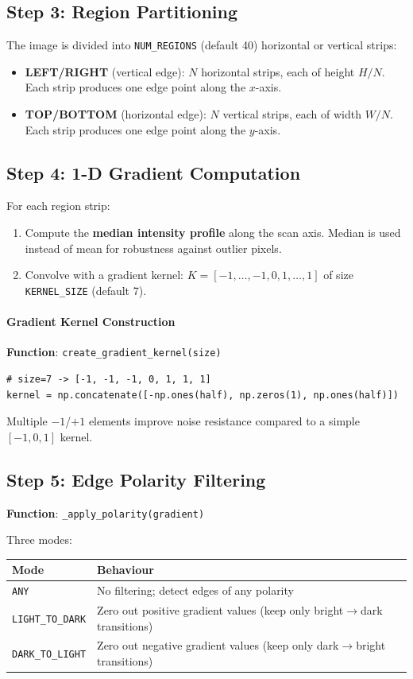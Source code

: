\documentclass[11pt,a4paper]{article}
\begin{document}
\subsection{Step 3: Region Partitioning}
The image is divided into \texttt{NUM\_REGIONS} (default 40) horizontal or vertical strips:

\begin{itemize}
\item \textbf{LEFT/RIGHT} (vertical edge): $N$ horizontal strips, each of height $H/N$. Each strip produces one edge point along the $x$-axis.
\item \textbf{TOP/BOTTOM} (horizontal edge): $N$ vertical strips, each of width $W/N$. Each strip produces one edge point along the $y$-axis.
\end{itemize}

\subsection{Step 4: 1-D Gradient Computation}
For each region strip:
\begin{enumerate}
\item Compute the \textbf{median intensity profile} along the scan axis. Median is used instead of mean for robustness against outlier pixels.
\item Convolve with a gradient kernel: $K = [-1, \ldots, -1, 0, 1, \ldots, 1]$ of size \texttt{KERNEL\_SIZE} (default 7).
\end{enumerate}

\paragraph{Gradient Kernel Construction}
\textbf{Function}: \texttt{create\_gradient\_kernel(size)}
\begin{lstlisting}
# size=7 -> [-1, -1, -1, 0, 1, 1, 1]
kernel = np.concatenate([-np.ones(half), np.zeros(1), np.ones(half)])
\end{lstlisting}
Multiple $-1$/$+1$ elements improve noise resistance compared to a simple $[-1, 0, 1]$ kernel.

\subsection{Step 5: Edge Polarity Filtering}
\textbf{Function}: \texttt{\_apply\_polarity(gradient)}

Three modes:
\begin{center}
\begin{tabular}{lp{9cm}}\toprule
\textbf{Mode} & \textbf{Behaviour}\\\midrule
\texttt{ANY} & No filtering; detect edges of any polarity\\
\texttt{LIGHT\_TO\_DARK} & Zero out positive gradient values (keep only bright$\rightarrow$dark transitions)\\
\texttt{DARK\_TO\_LIGHT} & Zero out negative gradient values (keep only dark$\rightarrow$bright transitions)\\\bottomrule
\end{tabular}
\end{center}
\end{document}
